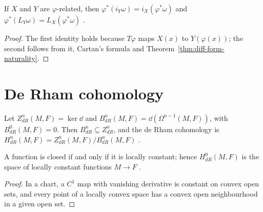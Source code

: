 \begin{proposition}
  \label{prop:related-forms}
  \leanok
  If $X$ and $Y$ are $\varphi$-related, then $\varphi^*(i_Y\omega) = i_X(\varphi^*\omega)$ and
  $\varphi^*(L_Y\omega) = L_X(\varphi^*\omega)$ \cite[Exercise~3.6.6]{GN26}.
\end{proposition}

\begin{proof}
  \leanok
  The first identity holds because $T\varphi$ maps $X(x)$ to $Y(\varphi(x))$; the second follows
  from it, Cartan's formula and Theorem~\ref{thm:diff-form-naturality}.
\end{proof}

\section{De Rham cohomology}

\begin{definition}
  \label{def:de-rham}
  \leanok
  Let $Z^n_{dR}(M, F) = \ker \dd$ and $B^n_{dR}(M, F) = \dd(\Omega^{n-1}(M, F))$, with
  $B^0_{dR}(M, F) = 0$. Then $B^n_{dR} \subseteq Z^n_{dR}$, and the de Rham cohomology is
  $H^n_{dR}(M, F) = Z^n_{dR}(M, F) / B^n_{dR}(M, F)$ \cite[Definition~3.6.11]{GN26}.
\end{definition}

\begin{theorem}
  \label{thm:closed-locally-constant}
  \leanok
  A function is closed if and only if it is locally constant; hence $H^0_{dR}(M, F)$ is the
  space of locally constant functions $M \to F$ \cite[Remark~3.6.12(b)]{GN26}.
\end{theorem}

\begin{proof}
  \leanok
  In a chart, a $C^1$ map with vanishing derivative is constant on convex open sets, and every
  point of a locally convex space has a convex open neighbourhood in a given open set.
\end{proof}

